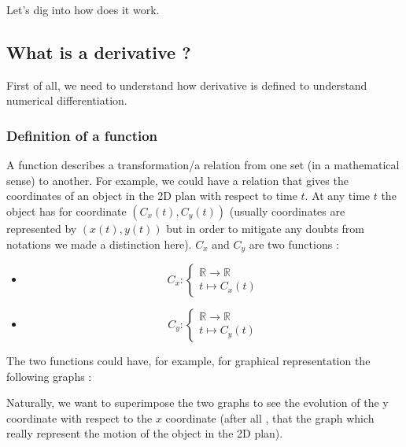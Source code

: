 \documentclass[12pt]{article}
\begin{document}
Let's dig into how does it work.

\subsection{What is a derivative ?}

First of all, we need to understand how derivative is defined to understand numerical differentiation. 

\subsubsection{Definition of a function}

A function describes a transformation/a relation from one set (in a mathematical sense) to another. For example, we could have a relation that gives the coordinates of an object in the 2D plan with respect to time $t$. At any time $t$ the object has for coordinate $(C_x(t), C_y(t))$ (usually coordinates are represented by $(x(t), y(t))$ but in order to mitigate any doubts from notations we made a distinction here). $C_x$ and $C_y$ are two functions :


\begin{itemize}
\item[]
$$
C_x: 
    \begin{cases}
        \mathbb{R} \rightarrow \mathbb{R} \\
        t \longmapsto C_x(t)
    \end{cases}
$$

\item[]
$$
C_y: 
    \begin{cases}
        \mathbb{R} \rightarrow \mathbb{R} \\
        t \longmapsto C_y(t)
    \end{cases}
$$
\end{itemize}



The two functions could have, for example, for graphical representation the following graphs : 

\begin{figure}[H]
 \centering
 
\end{figure}

Naturally, we want to superimpose the two graphs to see the evolution of the y coordinate with respect to the $x$ coordinate (after all , that the graph which really represent the motion of the object in the 2D plan). 
\end{document}
